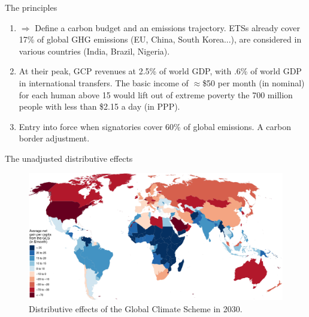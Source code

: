 \documentclass[aspectratio=169,xcolor=dvipsnames, 11pt,mathserif]{beamer}
\begin{document}
\begin{framefont}{\small}
\begin{frame}{The principles}
    \begin{enumerate}[<+->]
        \item {}
        \bbvsp \ip $\Rightarrow$ Define a carbon budget and an emissions trajectory.
        \ip ETSs already cover 17\% of global GHG emissions (EU, China, South Korea...), are considered in various countries (India, Brazil, Nigeria).
        \ee
        \item {}
        \bbvsp \ip At their peak, GCP revenues at 2.5\% of world GDP, with .6\% of world GDP in international transfers. 
        \ip The basic income of $\approx$\$50 per month (in nominal) for each human above 15 would lift out of extreme poverty the 700 million people with less than \$2.15 a day (in PPP).
        \ee
        \item {}
        \bbvsp \ip Entry into force when signatories cover 60\% of global emissions.
        \ip A carbon border adjustment. \ee %
    \end{enumerate}
\end{frame}

\begin{frame}{The unadjusted distributive effects}
    \begin{figure}
        \centering 
        \caption{Distributive effects of the Global Climate Scheme in 2030.}
        \includegraphics[height=.8\textheight]{../figures/maps/mean_gain_2030.pdf} 
    \end{figure}        
\end{frame}


\end{framefont}
\end{document}

